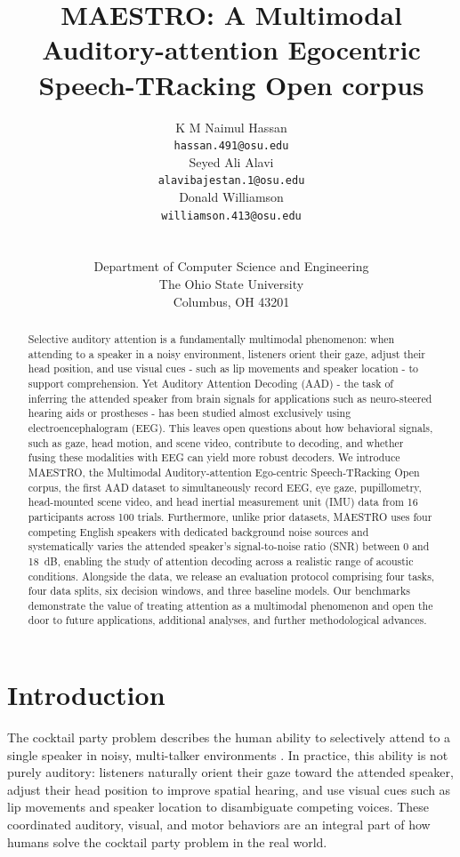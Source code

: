 \documentclass{article}
\title{MAESTRO: A Multimodal Auditory-attention Egocentric Speech-TRacking Open corpus}
\author{%
  K M Naimul Hassan\\
  \texttt{hassan.491@osu.edu}\\
  \And
  Seyed Ali Alavi\\
  \texttt{alavibajestan.1@osu.edu}\\
  \And
  Donald Williamson\\
  \texttt{williamson.413@osu.edu}\\
  \\
  \\
  Department of Computer Science and Engineering\\
  The Ohio State University\\
  Columbus, OH 43201 \\
}
\begin{document}
\maketitle



\begin{abstract}
Selective auditory attention is a fundamentally multimodal phenomenon: when attending to a speaker in a noisy environment, listeners orient their gaze, adjust their head position, and use visual cues - such as lip movements and speaker location - to support comprehension. Yet Auditory Attention Decoding (AAD) - the task of inferring the attended speaker from brain signals for applications such as neuro-steered hearing aids or prostheses - has been studied almost exclusively using electroencephalogram (EEG). This leaves open questions about how behavioral signals, such as gaze, head motion, and scene video, contribute to decoding, and whether fusing these modalities with EEG can yield more robust decoders. We introduce MAESTRO, the Multimodal Auditory-attention Ego-centric Speech-TRacking Open corpus, the first AAD dataset to simultaneously record EEG, eye gaze, pupillometry, head-mounted scene video, and head inertial measurement unit (IMU) data from 16 participants across 100 trials. Furthermore, unlike prior datasets, MAESTRO uses four competing English speakers with dedicated background noise sources and systematically varies the attended speaker’s signal-to-noise ratio (SNR) between 0 and 18~dB, enabling the study of attention decoding across a realistic range of acoustic conditions. Alongside the data, we release an evaluation protocol comprising four tasks, four data splits, six decision windows, and three baseline models. Our benchmarks demonstrate the value of treating attention as a multimodal phenomenon and open the door to future applications, additional analyses, and further methodological advances.

\end{abstract}



\section{Introduction}
\label{sec:intro}

The cocktail party problem describes the human ability to selectively attend to a single speaker in noisy, multi-talker environments \cite{cherry1953}. In practice, this ability is not purely auditory: listeners naturally orient their gaze toward the attended speaker, adjust their head position to improve spatial hearing, and use visual cues such as lip movements and speaker location to disambiguate competing voices. These coordinated auditory, visual, and motor behaviors are an integral part of how humans solve the cocktail party problem in the real world. 
\end{document}
